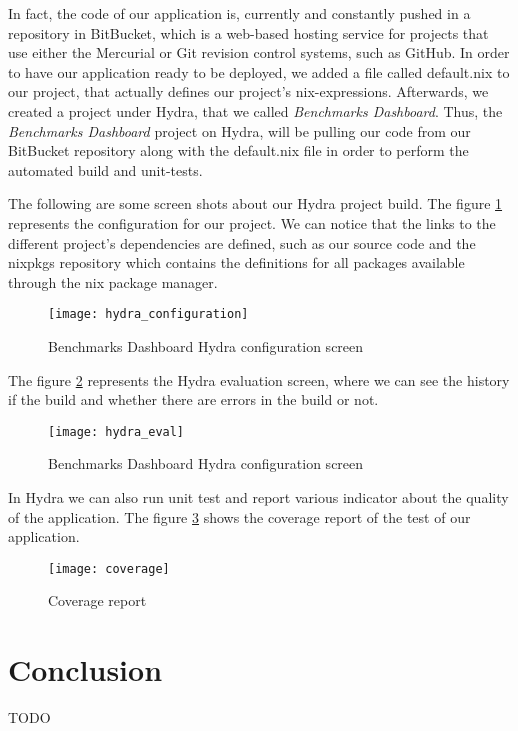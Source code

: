 In fact, the code of our application is, currently and constantly pushed in a
repository in BitBucket, which is a web-based hosting service for projects that
use either the Mercurial or Git revision control systems, such as GitHub. In
order to have our application ready to be deployed, we added a file called
default.nix to our project, that actually defines our project’s nix-expressions.
Afterwards, we created a project under Hydra, that we called \emph{Benchmarks
  Dashboard}. Thus, the \emph{Benchmarks Dashboard} project on Hydra, will be
pulling our code from our BitBucket repository along with the default.nix file
in order to perform the automated build and unit-tests.

The following are some screen shots about our Hydra project build. The figure
\hyperref[fig:hydra_configuration]{\ref{fig:hydra_configuration}}
represents the configuration for our project. We can notice that the links to the
different project's dependencies are defined, such as our source code and the
nixpkgs repository which contains the definitions for all packages available through
the nix package manager.

\begin{figure}[h]
\texttt{[image: hydra\_configuration]}
\caption{Benchmarks Dashboard Hydra configuration screen}
\label{fig:hydra_configuration}
\end{figure}

The figure \hyperref[fig:hydra_eval]{\ref{fig:hydra_eval}} represents the Hydra
evaluation screen, where we can see the history if the build and whether there
are errors in the build or not.

\begin{figure}[h]
\texttt{[image: hydra\_eval]}
\caption{Benchmarks Dashboard Hydra configuration screen}
\label{fig:hydra_eval}
\end{figure}

In Hydra we can also run unit test and report various indicator about the
quality of the application. The figure
\hyperref[fig:coverage]{\ref{fig:coverage}} shows the coverage report of the test
of our application.

\begin{figure}[h]
\texttt{[image: coverage]}
\caption{Coverage report}
\label{fig:coverage}
\end{figure}

\clearpage
\section*{Conclusion}
TODO
